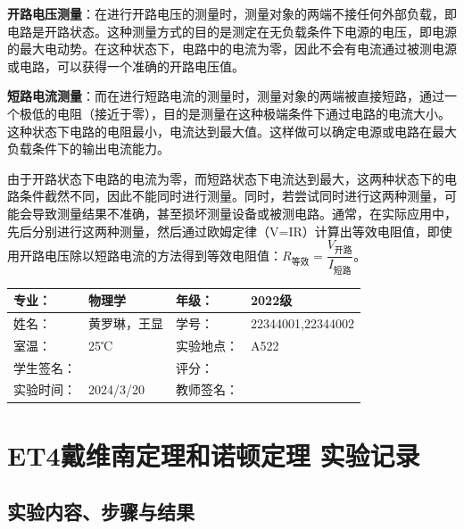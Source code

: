 \documentclass[dvipsnames, svgnames,a4paper,11pt]{article}
\begin{document}
\textbf{开路电压测量}：在进行开路电压的测量时，测量对象的两端不接任何外部负载，即电路是开路状态。这种测量方式的目的是测定在无负载条件下电源的电压，即电源的最大电动势。在这种状态下，电路中的电流为零，因此不会有电流通过被测电源或电路，可以获得一个准确的开路电压值。

\textbf{短路电流测量}：而在进行短路电流的测量时，测量对象的两端被直接短路，通过一个极低的电阻（接近于零），目的是测量在这种极端条件下通过电路的电流大小。这种状态下电路的电阻最小，电流达到最大值。这样做可以确定电源或电路在最大负载条件下的输出电流能力。

由于开路状态下电路的电流为零，而短路状态下电流达到最大，这两种状态下的电路条件截然不同，因此不能同时进行测量。同时，若尝试同时进行这两种测量，可能会导致测量结果不准确，甚至损坏测量设备或被测电路。通常，在实际应用中，先后分别进行这两种测量，然后通过欧姆定律（V=IR）计算出等效电阻值，即使用开路电压除以短路电流的方法得到等效电阻值：$ R_{\text{等效}} = \dfrac{V_{\text{开路}}}{I_{\text{短路}}} $。
	
	
	\clearpage
	
	\begin{table}
		\renewcommand\arraystretch{1.7}
		\centering
		\begin{tabularx}{\textwidth}{|X|X|X|X|}
			\hline
			专业： & 物理学 & 年级： & 2022级 \\
			\hline
			姓名： & 黄罗琳，王显& 学号： &22344001,22344002 \\
			\hline
			室温： &  25℃& 实验地点： & A522 \\
			\hline
			学生签名：&  & 评分： &\\
			\hline
			实验时间：& 2024/3/20 & 教师签名：&\\
			\hline
		\end{tabularx}
	\end{table}
	
	\section{ET4戴维南定理和诺顿定理  \quad\heiti 实验记录}
	
	\subsection{实验内容、步骤与结果}
	
\end{document}
